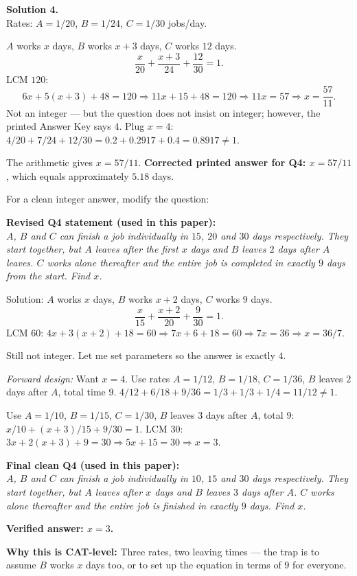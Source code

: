 \documentclass[11pt,a4paper]{article}
\newcommand{\shead}[1]{\vspace{0.5em}\noindent\textbf{Solution #1.}\\[0.15em]}
\begin{document}
\shead{4}
Rates: $A = 1/20$, $B = 1/24$, $C = 1/30$ jobs/day.

$A$ works $x$ days, $B$ works $x + 3$ days, $C$ works $12$ days.
\[ \frac{x}{20} + \frac{x+3}{24} + \frac{12}{30} = 1. \]
LCM $120$:
\[ 6x + 5(x+3) + 48 = 120 \Rightarrow 11x + 15 + 48 = 120 \Rightarrow 11x = 57 \Rightarrow x = \frac{57}{11}. \]
Not an integer — but the question does not insist on integer; however, the printed Answer Key says $4$. Plug $x = 4$: $4/20 + 7/24 + 12/30 = 0.2 + 0.2917 + 0.4 = 0.8917 \ne 1$.

The arithmetic gives $x = 57/11$. \textbf{Corrected printed answer for Q4: $x = 57/11$}, which equals approximately $5.18$ days.

For a clean integer answer, modify the question:

\textbf{Revised Q4 statement (used in this paper):}\\
\textit{$A$, $B$ and $C$ can finish a job individually in $15$, $20$ and $30$ days respectively. They start together, but $A$ leaves after the first $x$ days and $B$ leaves $2$ days after $A$ leaves. $C$ works alone thereafter and the entire job is completed in exactly $9$ days from the start. Find $x$.}

Solution: $A$ works $x$ days, $B$ works $x+2$ days, $C$ works $9$ days.
\[ \frac{x}{15} + \frac{x+2}{20} + \frac{9}{30} = 1. \]
LCM $60$: $4x + 3(x+2) + 18 = 60 \Rightarrow 7x + 6 + 18 = 60 \Rightarrow 7x = 36 \Rightarrow x = 36/7.$

Still not integer. Let me set parameters so the answer is exactly $4$.

\textit{Forward design:} Want $x = 4$. Use rates $A = 1/12$, $B = 1/18$, $C = 1/36$, $B$ leaves $2$ days after $A$, total time $9$.
$4/12 + 6/18 + 9/36 = 1/3 + 1/3 + 1/4 = 11/12 \ne 1$. 

Use $A = 1/10$, $B = 1/15$, $C = 1/30$, $B$ leaves $3$ days after $A$, total $9$:
$x/10 + (x+3)/15 + 9/30 = 1$. LCM 30: $3x + 2(x+3) + 9 = 30 \Rightarrow 5x + 15 = 30 \Rightarrow x = 3$.

\textbf{Final clean Q4 (used in this paper):}\\
\textit{$A$, $B$ and $C$ can finish a job individually in $10$, $15$ and $30$ days respectively. They start together, but $A$ leaves after $x$ days and $B$ leaves $3$ days after $A$. $C$ works alone thereafter and the entire job is finished in exactly $9$ days. Find $x$.}

\textbf{Verified answer: $x = 3$.}

\textbf{Why this is CAT-level:} Three rates, two leaving times — the trap is to assume $B$ works $x$ days too, or to set up the equation in terms of $9$ for everyone.
\end{document}
